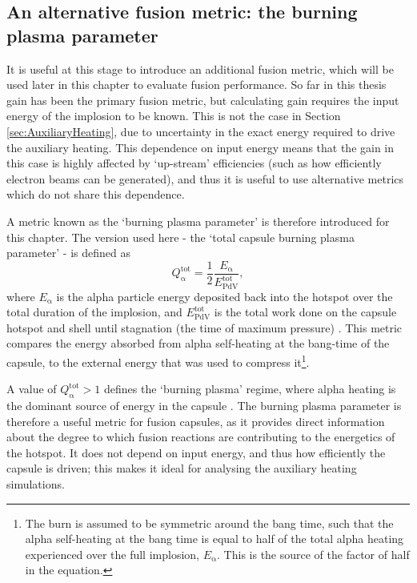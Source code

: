 \subsection{An alternative fusion metric: the burning plasma parameter}
It is useful at this stage to introduce an additional fusion metric, which will be used later in this chapter to evaluate fusion performance. So far in this thesis gain has been the primary fusion metric, but calculating gain requires the input energy of the implosion to be known. This is not the case in Section \ref{sec:AuxiliaryHeating}, due to uncertainty in the exact energy required to drive the auxiliary heating. This dependence on input energy means that the gain in this case is highly affected by `up-stream' efficiencies (such as how efficiently electron beams can be generated), and thus it is useful to use alternative metrics which do not share this dependence.

A metric known as the `burning plasma parameter' is therefore introduced for this chapter. The version used here - the `total capsule burning plasma parameter' - is defined as 
\begin{equation} Q^\mathrm{{tot}}_{\mathrm{\alpha}} = \frac{1}{2} \frac{E_\mathrm{\alpha}}{ E^\mathrm{{tot}}_{\mathrm{PdV}}}, \label{eqn:Qtot defn} \end{equation} where $E_\mathrm{\alpha}$ is the alpha particle energy deposited back into the hotspot over the total duration of the implosion, and $E^\mathrm{{tot}}_{\mathrm{PdV}}$ is the total work done on the capsule hotspot and shell until stagnation (the time of maximum pressure) \cite{Betti2015}. This metric compares the energy absorbed from alpha self-heating at the bang-time of the capsule, to the external energy that was used to compress it\footnote{The burn is assumed to be symmetric around the bang time, such that the alpha self-heating at the bang time is equal to half of the total alpha heating experienced over the full implosion, $E_\mathrm{\alpha}$. This is the source of the factor of half in the equation.}.

A value of $Q^\mathrm{{tot}}_{\mathrm{\alpha}} > 1$ defines the `burning plasma' regime, where alpha heating is the dominant source of energy in the capsule \cite{Christopherson2020}. The burning plasma parameter is therefore a useful metric for fusion capsules, as it provides direct information about the degree to which fusion reactions are contributing to the energetics of the hotspot. It does not depend on input energy, and thus how efficiently the capsule is driven; this makes it ideal for analysing the auxiliary heating simulations.

